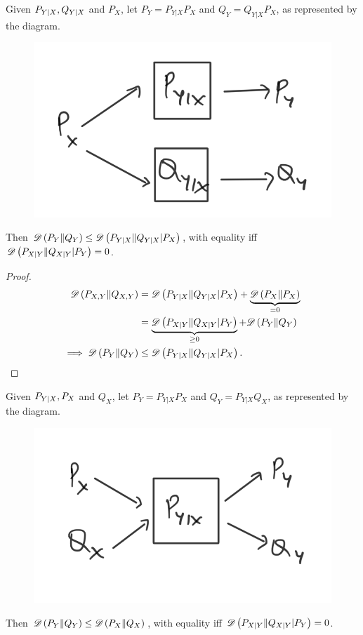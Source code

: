 \documentclass[11pt,a4paper]{article}
\begin{document}
\begin{theorem}
    Given $P_{Y|X}, Q_{Y|X}$ and $P_X$, let $P_Y = P_{Y|X} P_X$ and $Q_Y = Q_{Y|X}P_X$, as represented by the diagram. 
    \begin{figure}[ht]
        \centering
        \includegraphics[width=0.3\linewidth]{images/Conditional_Divergence.png}
        \label{fig:Conditional_Divergence}
    \end{figure}

    \noindent Then $\mathscr{D} \left(P_Y\|Q_Y\right)\le \mathscr{D} \left(P_{Y|X}\|Q_{Y|X} |P_X\right)$, with equality iff $\mathscr{D} \left(P_{X|Y}\|Q_{X|Y} |P_Y\right) = 0$.  
\end{theorem}

\begin{proof}
\begin{align*}
    \mathscr{D} \left(P_{X,Y}\|Q_{X,Y}\right)  &= \mathscr{D} \left(P_{Y|X}\|Q_{Y|X} |P_X\right) +  \underbrace{\mathscr{D} \left(P_X\|P_X\right)}_{ = 0} \\
        &= \underbrace{\mathscr{D} \left(P_{X|Y}\|Q_{X|Y} |P_Y\right)}_{\geq 0}  + \mathscr{D} \left(P_Y\|Q_Y\right)\\
    \implies \mathscr{D} \left(P_Y\|Q_Y\right) &\le \mathscr{D} \left(P_{Y|X}\|Q_{Y|X} |P_X\right).
\end{align*}
\end{proof}

\begin{theorem}
    Given $P_{Y|X}, P_X$ and $Q_X$, let $P_Y = P_{Y|X} P_X$ and $Q_Y = P_{Y|X}Q_X$, as represented by the diagram. 
    \begin{figure}[ht]
        \centering
        \includegraphics[width=0.3\linewidth]{images/DPI_Divergence.png}
        \label{fig:DPI_Divergence}
    \end{figure}

    \noindent Then $\mathscr{D} \left(P_Y\|Q_Y\right)\le \mathscr{D} \left(P_X\|Q_X\right)$, with equality iff $\mathscr{D} \left(P_{X|Y}\|Q_{X|Y} |P_Y\right) = 0$.
\end{theorem}
\end{document}
